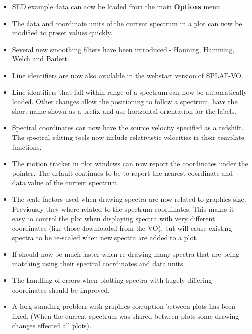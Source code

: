 \documentclass[twoside,11pt]{article}
\renewcommand{\_}{\texttt{\symbol{95}}}
\newcommand{\SPLAT}{\textsf{SPLAT-VO}}
\newcommand{\labelitem}[1]{\textbf{#1}}
\begin{document}
\begin{itemize}
\item SED example data can now be loaded from the main \labelitem{Options}
      menu.

\item The data and coordinate units of the current spectrum in a plot
      can now be modified to preset values quickly.

\item Several new smoothing filters have been introduced - Hanning, Hamming,
      Welch and Barlett.

\item Line identifiers are now also available in the webstart version of \SPLAT.

\item Line identifiers that fall within range of a spectrum can now be
      automatically loaded. Other changes allow the positioning to follow
      a spectrum, have the short name shown as a prefix and use horizontal
      orientation for the labels.

\item Spectral coordinates can now have the source velocity specified
      as a redshift. The spectral editing tools now include relativistic
      velocities in their template functions.

\item The motion tracker in plot windows can now report the coordinates
      under the pointer. The default continues to be to report the nearest
      coordinate and data value of the current spectrum.

\item The scale factors used when drawing spectra are now related to
      graphics size. Previously they where related to the spectrum
      coordinates. This makes it easy to control the plot when displaying
      spectra with very different coordinates (like those downloaded from
      the VO), but will cause existing spectra to be re-scaled when new
      spectra are added to a plot.

\item If should now be much faster when re-drawing many spectra that are
      being matching using their spectral coordinates and data units.

\item The handling of errors when plotting spectra with hugely differing
      coordinates should be improved.

\item A long standing problem with graphics corruption between plots has
      been fixed. (When the current spectrum was shared between plots
      some drawing changes effected all plots).


\end{itemize}
\end{document}

